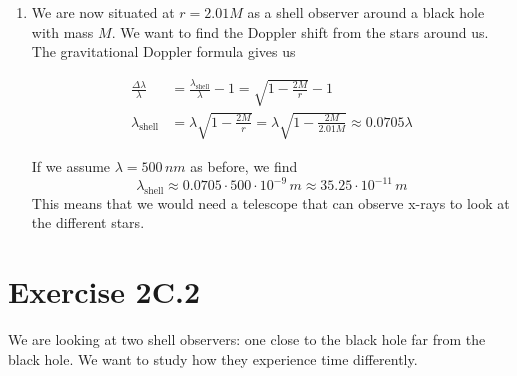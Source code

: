 \documentclass[a4paper,10pt,english]{article}
\begin{document}
\begin{enumerate}
\item We are now situated at $r=2.01M$ as a shell observer around a black hole with mass $M$. We want to find the Doppler shift from the stars around us. The gravitational Doppler formula gives us

\begin{align*}
\frac{\Delta \lambda}{\lambda}&=\frac{\lambda_{\text{shell}}}{\lambda}-1=\sqrt{1-\frac{2M}{r}}-1\\
\lambda_{\text{shell}}&=\lambda\sqrt{1-\frac{2M}{r}}=\lambda\sqrt{1-\frac{2M}{2.01M}}\approx0.0705\lambda
\end{align*}

If we assume $\lambda=500\,nm$ as before, we find 
\[\lambda_{\text{shell}}\approx0.0705\cdot500\cdot10^{-9}\,m\approx35.25\cdot10^{-11}\,m\]
This means that we would need a telescope that can observe x-rays to look at the different stars.

\end{enumerate}
  








\section*{Exercise 2C.2}

We are looking at two shell observers: one close to the black hole far from the black hole. We want to study how they experience time differently.
\end{document}
